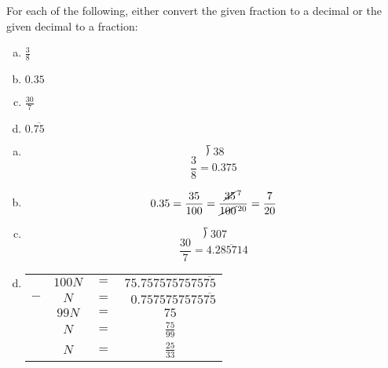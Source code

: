 \documentclass[11pt,letterpaper]{article}
\begin{document}
\newpage



 For each of the following, either convert the given fraction to a decimal or the given decimal to a fraction:
	\begin{enumerate}[(a)]
	\item $\frac{3}{8}$
	\item $0.35$
	\item $\frac{30}{7}$
	\item $0.\overline{75}$
	\end{enumerate} 

\sol
\begin{enumerate}[(a)]
\item 
	\[
	\longdivision{3}{8}
	\] 
	\[
	\dfrac{3}{8}= 0.375
	\]

\item 
	\[
	0.35= \dfrac{35}{100}= \dfrac{\cancel{35}^{\,7}}{\cancel{100}^{\,20}}= \dfrac{7}{20}
	\]

\item 
	\[
	\longdivision{30}{7}
	\] 
	\[
	\dfrac{30}{7}= 4.\overline{285714}
	\]



\newpage



\item \phantom{.}\par
	\begin{table}[!ht]
	\centering\small
	\begin{tabular}{rccc}
	& $100N$ & $=$ & $75.7575757575\overline{75}$ \\ 
	$-$ & $N$ & $=$ & $\phantom{0}0.7575757575\overline{75}$ \\ \hline
	& $99N$ & $=$ & $75$ \\[0.1cm]
	& $N$ & $=$ & $\frac{75}{99}$ \\[0.1cm]
	& $N$ & $=$ & $\frac{25}{33}$
	\end{tabular}
	\end{table} \par
\end{enumerate}
\end{document}
